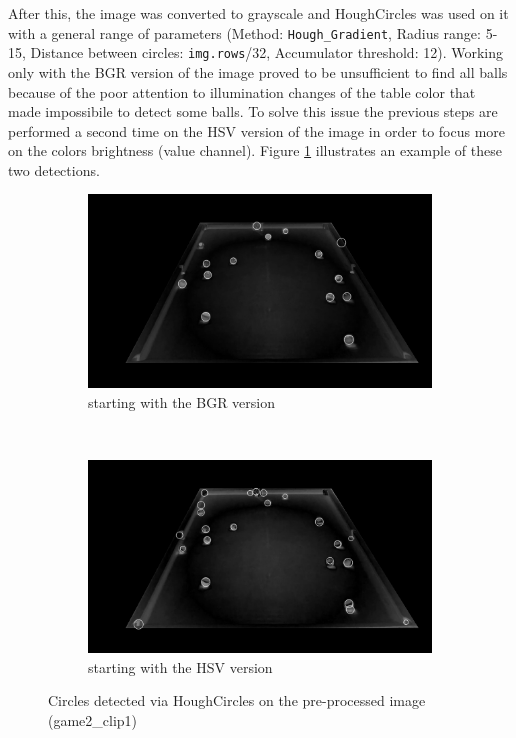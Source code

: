 After this, the image was converted to grayscale and HoughCircles was used on it with a general range
of parameters (Method: \verb|Hough_Gradient|, Radius range: 5-15, Distance between circles: \verb|img.rows|/32, Accumulator threshold: 12).
Working only with the BGR version of the image proved to be unsufficient to find all balls because of the 
poor attention to illumination changes of the table color that made impossibile to detect some balls. To solve this issue
the previous steps are performed a second time on the HSV version of the image in order to focus more on 
the colors brightness (value channel). Figure \ref{fig:circles} illustrates an example of these two detections. 
\begin{figure}[h!]
    \centering
    \begin{subfigure}[b]{0.85\textwidth}
        \centering
        \includegraphics[width=\textwidth]{imgs/ball_localization/circlesBGR.jpg}
        \caption{starting with the BGR version}
    \end{subfigure}
    \\
    \begin{subfigure}[b]{0.85\textwidth}
        \centering
        \includegraphics[width=\textwidth]{imgs/ball_localization/circlesHSV.jpg}
        \caption{starting with the HSV version}
    \end{subfigure}
    \caption{Circles detected via HoughCircles on the pre-processed image (game2\_clip1)}
    \label{fig:circles}
\end{figure}


